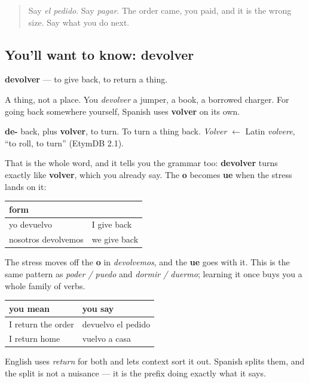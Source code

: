 \begin{quote}
Say \emph{el pedido}. Say \emph{pagar}. The order came, you paid, and it is the wrong size. Say what you do next.
\end{quote}

\subsection*{You'll want to know: devolver}
\textbf{devolver} — to give back, to return a thing.

A thing, not a place. You \emph{devolver} a jumper, a book, a borrowed charger. For going back somewhere yourself, Spanish uses \textbf{volver} on its own.

\begin{cousinweb}
\textbf{de-} back, plus \textbf{volver}, to turn. To turn a thing back. \emph{Volver} $\leftarrow$ Latin \emph{volvere}, \textquotedblleft{}to roll, to turn\textquotedblright{} (EtymDB 2.1).

That is the whole word, and it tells you the grammar too: \textbf{devolver} turns exactly like \textbf{volver}, which you already say. The \textbf{o} becomes \textbf{ue} when the stress lands on it:

\noindent
\begin{tabularx}{\linewidth}{@{}>{\raggedright\arraybackslash}X>{\raggedright\arraybackslash}X@{}}
\toprule
\textbf{form} & \textbf{} \\
\midrule
yo devuelvo & I give back \\
nosotros devolvemos & we give back \\
\bottomrule
\end{tabularx}

The stress moves off the \textbf{o} in \emph{devolvemos}, and the \textbf{ue} goes with it. This is the same pattern as \emph{poder / puedo} and \emph{dormir / duermo}; learning it once buys you a whole family of verbs.
\end{cousinweb}

\begin{grammarlens}[title={Grammar Lens: the two ways back}]
\noindent
\begin{tabularx}{\linewidth}{@{}>{\raggedright\arraybackslash}X>{\raggedright\arraybackslash}X@{}}
\toprule
\textbf{you mean} & \textbf{you say} \\
\midrule
I return the order & devuelvo el pedido \\
I return home & vuelvo a casa \\
\bottomrule
\end{tabularx}

English uses \emph{return} for both and lets context sort it out. Spanish splits them, and the split is not a nuisance — it is the prefix doing exactly what it says.
\end{grammarlens}

